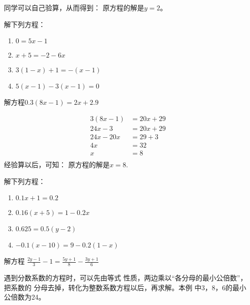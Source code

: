 同学可以自己验算，从而得到： 原方程的解是$y=2$。


\begin{ex}
解下列方程： 
\begin{multicols}{2}
    \begin{enumerate}
\item $0=5x-1$
\item   $x+5=-2-6x$
\item $3(1-x)+1=-(x-1)$      
\item $5(x-1)-3(x-1)=0$
    \end{enumerate}
\end{multicols}
\end{ex}

\begin{example}
    解方程$0.3(8x-1)=2x+2.9$
\end{example}

\begin{solution}
\begin{align*}
    3 (8x-1)&=20x+29  \tag{原方程两边乘以10}\\
    24x-3&=20x+29   \tag{去括号}\\
    24x-20x&=29+3\tag{移项变号}\\
    4x &= 32\tag{合并同类项}\\
    x&=8\tag{两边除以4}\\
\end{align*}
经验算以后，可知：
原方程的解是$x=8$.    
\end{solution}

\begin{ex}
解下列方程：
\begin{multicols}{2}
\begin{enumerate}
    \item $0.1x+1=0.2$
    \item $0.16(x+5)=1-0.2x$
    \item $0.625=0.5(y-2)$
    \item $-0.1(x-10)=9-0.2(1-x)$
\end{enumerate}
\end{multicols}
\end{ex}

\begin{example}
  解方程
$\frac{2y-1}{3}-1=\frac{5y+1}{8}-\frac{3y+1}{6}$
\end{example}

\begin{analyze}
   遇到分数系数的方程时，可以先由等式
    性质，两边乘以“各分母的最小公倍数”，把系数的
    分母去掉，转化为整数系数方程以后，再求解。本例
    中3，8，6的最小公倍数为24。
\end{analyze}

